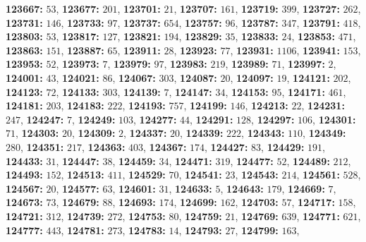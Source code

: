 \textsf{\bfseries 123667:} $53$, \textsf{\bfseries 123677:} $201$, \textsf{\bfseries 123701:} $21$, \textsf{\bfseries 123707:} $161$, \textsf{\bfseries 123719:} $399$, \textsf{\bfseries 123727:} $262$, \textsf{\bfseries 123731:} $146$, \textsf{\bfseries 123733:} $97$, \textsf{\bfseries 123737:} $654$, \textsf{\bfseries 123757:} $96$, \textsf{\bfseries 123787:} $347$, \textsf{\bfseries 123791:} $418$, \textsf{\bfseries 123803:} $53$, \textsf{\bfseries 123817:} $127$, \textsf{\bfseries 123821:} $194$, \textsf{\bfseries 123829:} $35$, \textsf{\bfseries 123833:} $24$, \textsf{\bfseries 123853:} $471$, \textsf{\bfseries 123863:} $151$, \textsf{\bfseries 123887:} $65$, \textsf{\bfseries 123911:} $28$, \textsf{\bfseries 123923:} $77$, \textsf{\bfseries 123931:} $1106$, \textsf{\bfseries 123941:} $153$, \textsf{\bfseries 123953:} $52$, \textsf{\bfseries 123973:} $7$, \textsf{\bfseries 123979:} $97$, \textsf{\bfseries 123983:} $219$, \textsf{\bfseries 123989:} $71$, \textsf{\bfseries 123997:} $2$, \textsf{\bfseries 124001:} $43$, \textsf{\bfseries 124021:} $86$, \textsf{\bfseries 124067:} $303$, \textsf{\bfseries 124087:} $20$, \textsf{\bfseries 124097:} $19$, \textsf{\bfseries 124121:} $202$, \textsf{\bfseries 124123:} $72$, \textsf{\bfseries 124133:} $303$, \textsf{\bfseries 124139:} $7$, \textsf{\bfseries 124147:} $34$, \textsf{\bfseries 124153:} $95$, \textsf{\bfseries 124171:} $461$, \textsf{\bfseries 124181:} $203$, \textsf{\bfseries 124183:} $222$, \textsf{\bfseries 124193:} $757$, \textsf{\bfseries 124199:} $146$, \textsf{\bfseries 124213:} $22$, \textsf{\bfseries 124231:} $247$, \textsf{\bfseries 124247:} $7$, \textsf{\bfseries 124249:} $103$, \textsf{\bfseries 124277:} $44$, \textsf{\bfseries 124291:} $128$, \textsf{\bfseries 124297:} $106$, \textsf{\bfseries 124301:} $71$, \textsf{\bfseries 124303:} $20$, \textsf{\bfseries 124309:} $2$, \textsf{\bfseries 124337:} $20$, \textsf{\bfseries 124339:} $222$, \textsf{\bfseries 124343:} $110$, \textsf{\bfseries 124349:} $280$, \textsf{\bfseries 124351:} $217$, \textsf{\bfseries 124363:} $403$, \textsf{\bfseries 124367:} $174$, \textsf{\bfseries 124427:} $83$, \textsf{\bfseries 124429:} $191$, \textsf{\bfseries 124433:} $31$, \textsf{\bfseries 124447:} $38$, \textsf{\bfseries 124459:} $34$, \textsf{\bfseries 124471:} $319$, \textsf{\bfseries 124477:} $52$, \textsf{\bfseries 124489:} $212$, \textsf{\bfseries 124493:} $152$, \textsf{\bfseries 124513:} $411$, \textsf{\bfseries 124529:} $70$, \textsf{\bfseries 124541:} $23$, \textsf{\bfseries 124543:} $214$, \textsf{\bfseries 124561:} $528$, \textsf{\bfseries 124567:} $20$, \textsf{\bfseries 124577:} $63$, \textsf{\bfseries 124601:} $31$, \textsf{\bfseries 124633:} $5$, \textsf{\bfseries 124643:} $179$, \textsf{\bfseries 124669:} $7$, \textsf{\bfseries 124673:} $73$, \textsf{\bfseries 124679:} $88$, \textsf{\bfseries 124693:} $174$, \textsf{\bfseries 124699:} $162$, \textsf{\bfseries 124703:} $57$, \textsf{\bfseries 124717:} $158$, \textsf{\bfseries 124721:} $312$, \textsf{\bfseries 124739:} $272$, \textsf{\bfseries 124753:} $80$, \textsf{\bfseries 124759:} $21$, \textsf{\bfseries 124769:} $639$, \textsf{\bfseries 124771:} $621$, \textsf{\bfseries 124777:} $443$, \textsf{\bfseries 124781:} $273$, \textsf{\bfseries 124783:} $14$, \textsf{\bfseries 124793:} $27$, \textsf{\bfseries 124799:} $163$, 
